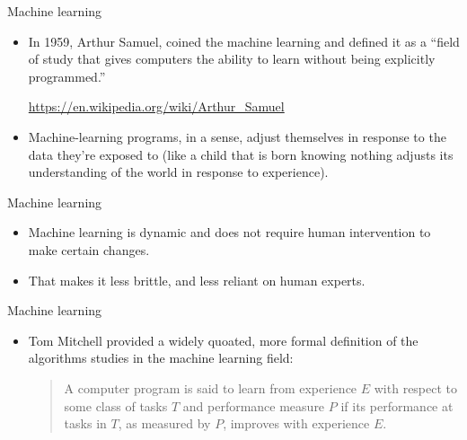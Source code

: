 \documentclass{beamer}
\begin{document}
\begin{frame}{Machine learning}
\begin{itemize}
\item In 1959, Arthur Samuel, coined the machine learning and defined it as a ``field of study that gives computers the ability to learn without being explicitly programmed.''

\url{https://en.wikipedia.org/wiki/Arthur_Samuel}

\item Machine-learning programs, in a sense, adjust themselves in response to the data they’re exposed to (like a child that is born knowing nothing adjusts its understanding of the world in response to experience).
\end{itemize}
\end{frame}

\begin{frame}{Machine learning}

\begin{itemize}
\item Machine learning is dynamic and does not require human intervention to make certain changes. 

\item That makes it less brittle, and less reliant on human experts.
\end{itemize}

\end{frame}


\begin{frame}{Machine learning}

\begin{itemize}
\item Tom Mitchell provided a widely quoated, more formal definition of the algorithms studies in the machine learning field:

\medskip
\begin{quote}
A computer program is said to learn from experience $E$ with respect to some class of tasks $T$ and performance measure $P$ if its performance at tasks in $T$, as measured by $P$, improves with experience $E$.
\end{quote}
\end{itemize}

\end{frame}
\end{document}
